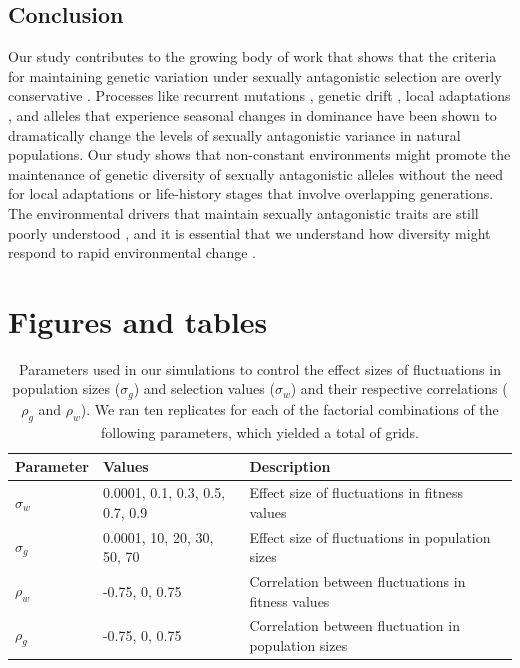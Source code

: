 \documentclass[12pt]{article}
\begin{document}
 \subsection*{Conclusion}

 Our study contributes to the growing body of work that shows that the criteria for maintaining genetic variation under sexually antagonistic selection are overly conservative \citep{connallon2012general,connallon_evolutionary_2018}. Processes like recurrent mutations \citep{radwan_maintenance_2008}, genetic drift \citep{connallon2012general}, local adaptations \citep{connallon_evolutionary_2018}, and alleles that experience seasonal changes in dominance \citep{wittmann2017seasonally} have been shown to dramatically change the levels of sexually antagonistic variance in natural populations. Our study shows that non-constant environments might promote the maintenance of genetic diversity of sexually antagonistic alleles without the need for local adaptations or life-history stages that involve overlapping generations. The environmental drivers that maintain sexually antagonistic traits are still poorly understood \citep{connallon2018environmental}, and it is essential that we understand how diversity might respond to rapid environmental change \citep{tylianakis2008global}.
 \clearpage

\clearpage
\section*{Figures and tables }


\begin{table}[h]
\fontsize{10}{18}\selectfont
\centering
\caption{Parameters used in our simulations to control the effect sizes of fluctuations in population sizes ($\sigma_{g}$) and selection values ($\sigma_{w}$) and their respective correlations ($\rho_{g}$ and $\rho_{w}$). We ran ten replicates for each of the factorial combinations of the following parameters, which yielded a total of grids. }
\begin{tabular}{@{}llll@{}}
\toprule
Parameter                    & Values                    & Description                                   &  \\ \midrule
$\sigma_{w}$ & 0.0001, 0.1, 0.3, 0.5, 0.7, 0.9 & Effect size of fluctuations in fitness values &  \\
$\sigma_{g}$ & 0.0001, 10, 20, 30, 50, 70 & Effect size of fluctuations in population sizes                                              &  \\
$\rho_{w}$  &  -0.75, 0, 0.75                         &   Correlation between fluctuations in fitness values                                            &  \\
$\rho_{g}$  &   -0.75, 0, 0.75                        &  Correlation between fluctuation in population sizes                                             &  \\ \bottomrule
\end{tabular}
\label{tab:fluctuations}
\end{table}
\end{document}

